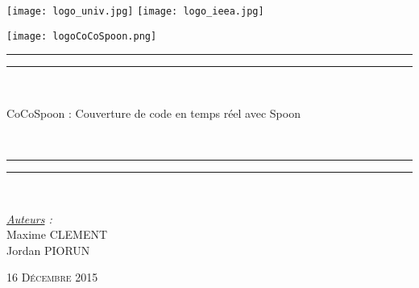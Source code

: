 \thispagestyle{cover}

\texttt{[image: logo\_univ.jpg]}
 \hfill \texttt{[image: logo\_ieea.jpg]} \\

\vspace*{10mm}

\begin{center}

	\vspace*{10mm}

	\texttt{[image: logoCoCoSpoon.png]}

	\rule[0.5ex]{\linewidth}{2pt}\vspace*{-\baselineskip}\vspace*{3.2pt}


	\rule[0.5ex]{\linewidth}{1pt}\\[\baselineskip]

		\begin{Huge}CoCoSpoon : Couverture de code en temps réel avec Spoon \end{Huge}\\[4mm]

	\rule[0.5ex]{\linewidth}{1pt}\vspace*{-\baselineskip}\vspace{3.2pt}
	\rule[0.5ex]{\linewidth}{2pt}\\

	\vspace*{20mm}

	{\LARGE \textit{\underline{Auteurs} :}}\\
	\vspace*{3mm}
	{\LARGE Maxime CLEMENT}\\
	\vspace*{3mm}
	{\LARGE Jordan PIORUN}\\
	
	\vspace*{20mm}
	
	{\LARGE\textsc{16 Décembre 2015}}
	
\end{center}